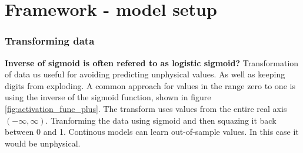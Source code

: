 \section{Framework - model setup}



\subsubsection{Transforming data} \label{sec:transforming_cloud_cover}
\textbf{Inverse of sigmoid is often refered to as logistic sigmoid?}
Transformation of data us useful for avoiding predicting unphysical values. As well as keeping digits from exploding.
A common approach for values in the range zero to one is using the inverse of the sigmoid function, shown in figure \ref{fig:activation_func_plus}. The transform uses values from the entire real axis $(-\infty, \infty)$. 
%
Tranforming the data using sigmoid and then squazing it back between 0 and 1. 
Continous models can learn out-of-sample values. In this case it would be unphysical.


